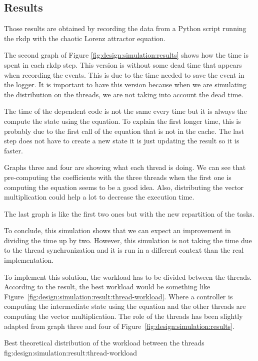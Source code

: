 \subsection{Results}
\label{ch:design:simulation:results}

Those results are obtained by recording the data from a Python script running
the \acrshort{rkdp} with the chaotic Lorenz attractor equation.

The second graph of Figure \ref{fig:design:simulation:results} shows
how the time is spent in each \acrshort{rkdp} step.
This version is without some dead time that appears when recording the events.
This is due to the time needed to save the event in the logger.
It is important to have this version because when we are simulating the
distribution on the threads, we are not taking into account the dead time.

The time of the dependent code is not the same every time but it is always the
compute the state using the equation.
To explain the first longer time, this is probably due to the first call of the
equation that is not in the cache.
The last step does not have to create a new state it is just updating the
result so it is faster.

Graphs three and four are showing what each thread is doing.
We can see that pre-computing the coefficients with the three threads when the
first one is computing the equation seems to be a good idea.
Also, distributing the vector multiplication could help a lot to decrease the
execution time.

The last graph is like the first two ones but with the new repartition of the
tasks.

To conclude, this simulation shows that we can expect an improvement in dividing
the time up by two.
However, this simulation is not taking the time due to the thread
synchronization and it is run in a different context than the real implementation.

To implement this solution, the workload has to be divided between the threads.
According to the result, the best workload would be something like Figure~\ref{fig:design:simulation:result:thread-workload}.
Where a controller is computing the intermediate state using the equation and the
other threads are computing the vector multiplication.
The role of the threads has been slightly adapted from graph three and
four of Figure~\ref{fig:design:simulation:results}.

        {Best theoretical distribution of the workload between the threads}
        {fig:design:simulation:result:thread-workload}


